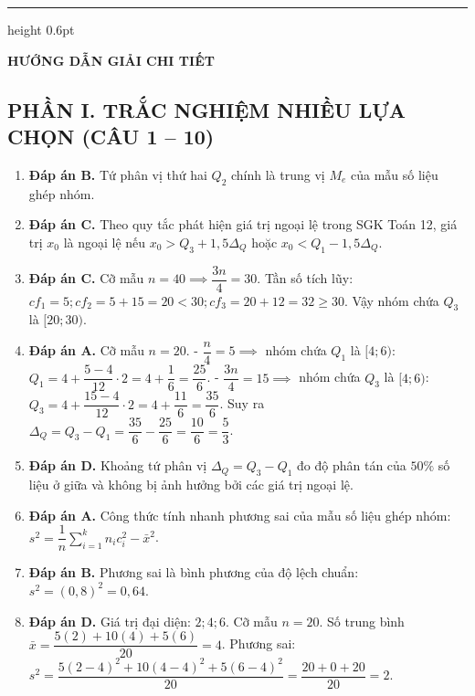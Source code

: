 \documentclass[12pt,a4paper]{article}
\begin{document}
\vspace{10pt}
\hrule height 0.6pt
\vspace{10pt}

\begin{center}
    {\fontsize{13}{15}\selectfont\textbf{HƯỚNG DẪN GIẢI CHI TIẾT}}
\end{center}

\subsection*{PHẦN I. TRẮC NGHIỆM NHIỀU LỰA CHỌN (CÂU 1 -- 10)}

\begin{enumerate}
\item \textbf{Đáp án B.}  
Tứ phân vị thứ hai $Q_2$ chính là trung vị $M_e$ của mẫu số liệu ghép nhóm.

\item \textbf{Đáp án C.}  
Theo quy tắc phát hiện giá trị ngoại lệ trong SGK Toán 12, giá trị $x_0$ là ngoại lệ nếu $x_0 > Q_3 + 1{,}5\Delta_Q$ hoặc $x_0 < Q_1 - 1{,}5\Delta_Q$.

\item \textbf{Đáp án C.}  
Cỡ mẫu $n = 40 \implies \dfrac{3n}{4} = 30$.  
Tần số tích lũy: $cf_1 = 5; cf_2 = 5 + 15 = 20 < 30; cf_3 = 20 + 12 = 32 \ge 30$.  
Vậy nhóm chứa $Q_3$ là $[20; 30)$.

\item \textbf{Đáp án A.}  
Cỡ mẫu $n = 20$.  
- $\dfrac{n}{4} = 5 \implies$ nhóm chứa $Q_1$ là $[4; 6)$: $Q_1 = 4 + \dfrac{5 - 4}{12} \cdot 2 = 4 + \dfrac{1}{6} = \dfrac{25}{6}$.  
- $\dfrac{3n}{4} = 15 \implies$ nhóm chứa $Q_3$ là $[4; 6)$: $Q_3 = 4 + \dfrac{15 - 4}{12} \cdot 2 = 4 + \dfrac{11}{6} = \dfrac{35}{6}$.  
Suy ra $\Delta_Q = Q_3 - Q_1 = \dfrac{35}{6} - \dfrac{25}{6} = \dfrac{10}{6} = \dfrac{5}{3}$.

\item \textbf{Đáp án D.}  
Khoảng tứ phân vị $\Delta_Q = Q_3 - Q_1$ đo độ phân tán của $50\%$ số liệu ở giữa và không bị ảnh hưởng bởi các giá trị ngoại lệ.

\item \textbf{Đáp án A.}  
Công thức tính nhanh phương sai của mẫu số liệu ghép nhóm: $s^2 = \dfrac{1}{n}\sum\limits_{i=1}^k n_i c_i^2 - \bar{x}^2$.

\item \textbf{Đáp án B.}  
Phương sai là bình phương của độ lệch chuẩn: $s^2 = (0{,}8)^2 = 0{,}64$.

\item \textbf{Đáp án D.}  
Giá trị đại diện: $2; 4; 6$. Cỡ mẫu $n = 20$. Số trung bình $\bar{x} = \dfrac{5(2) + 10(4) + 5(6)}{20} = 4$.  
Phương sai: $s^2 = \dfrac{5(2-4)^2 + 10(4-4)^2 + 5(6-4)^2}{20} = \dfrac{20 + 0 + 20}{20} = 2$.


\end{enumerate}
\end{document}
